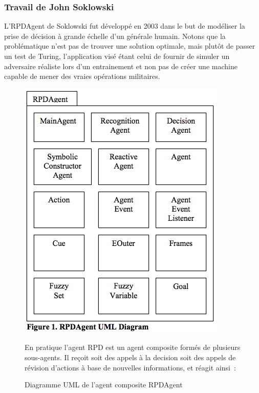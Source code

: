 \documentclass{article}
\begin{document}
\subsubsection{Travail de John Soklowski}
L'RPDAgent de Soklowski fut développé en 2003 dans le but de modéliser la prise de décision à grande échelle d'un générale humain. Notons que la problématique n'est pas de trouver une solution optimale, mais plutôt de passer un test de Turing, l'application visé étant celui de fournir de simuler un adversaire réaliste lors d'un entrainement et non pas de créer une machine capable de mener des vraies opérations militaires.
\begin{figure}[H]
\centering
\begin{minipage}[H]{0.4\linewidth}
	\centering
	\includegraphics[width=\textwidth]{../ressources/RPDagent_uml}
	\caption{Diagramme UML de l'agent composite RPDAgent}
\end{minipage}
\hfill
\begin{minipage}[H]{0.55\linewidth}
En pratique l'agent RPD est un agent composite formés de plusieurs sous-agents. Il reçoit soit des appels à la decision soit des appels de révision d'actions à base de nouvelles informations, et réagit ainsi~:

\end{minipage}
\end{figure}
\end{document}
